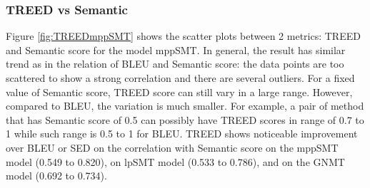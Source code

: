 %

\subsubsection{\textbf{TREED vs Semantic}}


Figure \ref{fig:TREEDmppSMT} shows the scatter plots between 2
metrics: TREED and Semantic score for the model mppSMT. In general, the result has similar
trend as in the relation of BLEU and Semantic score: the data points
are too scattered to show a strong correlation and there are
several outliers. For a fixed value of Semantic score, TREED score can
still vary in a large range. However, compared to BLEU, the variation
is much smaller. For example, a pair of method that has Semantic score
of 0.5 can possibly have TREED scores in range of 0.7 to 1 while such
range is 0.5 to 1 for BLEU. TREED shows noticeable improvement over
BLEU or SED on the correlation with Semantic score on the mppSMT model
(0.549 to 0.820), on lpSMT model (0.533 to 0.786), and on the GNMT model (0.692 to 0.734). 

%



